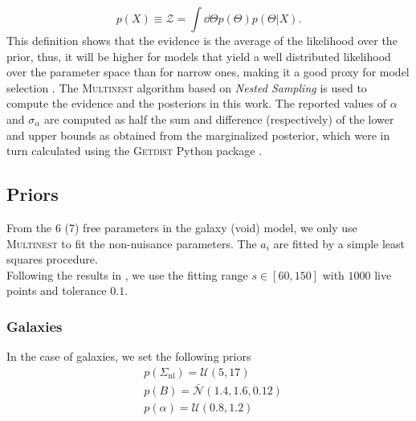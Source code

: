 \documentclass[fleqn, usenatbib]{mnras}
\begin{document}
\begin{equation}
p(X)\equiv\mathcal{Z} = \int\dd\Theta p(\Theta)p(\Theta|X).
\end{equation}
This definition shows that the evidence is the average of the likelihood over the prior, thus, it will be higher for models that yield a well distributed likelihood over the parameter space than for narrow ones, making it a good proxy for model selection \citep{Feroz2008}. The \textsc{Multinest} algorithm \citep{Feroz2008} based on \textit{Nested Sampling} \citep{Skilling2004} is used to compute the evidence and the posteriors in this work. The reported values of $\alpha$ and $\sigma_\alpha$ are computed as half the sum and difference (respectively) of the lower and upper bounds as obtained from the marginalized posterior, which were in turn calculated using the \textsc{Getdist} Python package \citep{Lewis2019}.
\subsection{Priors}
From the 6 (7) free parameters in the galaxy (void) model, we only use \textsc{Multinest} to fit the non-nuisance parameters. The $a_i$ are fitted by a simple least squares procedure.\\
Following the results in \citet{Zhao2019}, we use the fitting range $s\in[60, 150]$ with $\num{1000}$ live points and tolerance $\num{0.1}$.
\subsubsection{Galaxies}
In the case of galaxies, we set the following priors
\begin{align}
&p(\Sigma_{\mathrm{nl}}) = \mathcal{U}(5, 17)\\
&p(B) = \bar{\mathcal{N}}(1.4, 1.6, 0.12)\\
&p(\alpha)=\mathcal{U}(0.8, 1.2)
\end{align}
\end{document}
